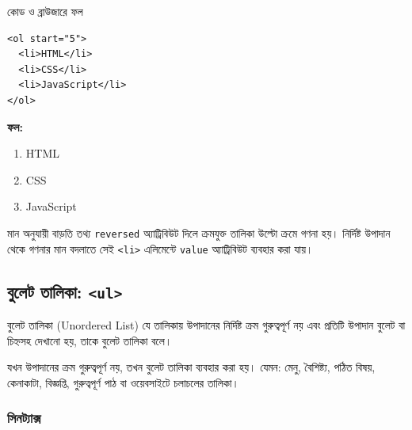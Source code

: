 \begin{chFourWholeExample}{কোড ও ব্রাউজারে ফল}
\noindent
\begin{minipage}[t]{.50\linewidth}\vspace{0pt}

\begin{verbatim}
<ol start="5">
  <li>HTML</li>
  <li>CSS</li>
  <li>JavaScript</li>
</ol>
\end{verbatim}

\end{minipage}\hfill
\begin{minipage}[t]{.46\linewidth}\vspace{0pt}
\textbf{ফল:}
\begin{enumerate}[start=5]
\item HTML
\item CSS
\item JavaScript
\end{enumerate}
\end{minipage}
\end{chFourWholeExample}

\begin{keypointbox}{মান অনুযায়ী বাড়তি তথ্য}
\texttt{reversed} অ্যাট্রিবিউট দিলে ক্রমযুক্ত তালিকা উল্টো ক্রমে গণনা হয়।
নির্দিষ্ট উপাদান থেকে গণনার মান বদলাতে সেই \texttt{<li>} এলিমেন্টে \texttt{value} অ্যাট্রিবিউট ব্যবহার করা যায়।
\end{keypointbox}



\subsection{বুলেট তালিকা: \texttt{<ul>}}

\begin{definitionbox}{বুলেট তালিকা (Unordered List)}
যে তালিকায় উপাদানের নির্দিষ্ট ক্রম গুরুত্বপূর্ণ নয় এবং প্রতিটি উপাদান বুলেট বা চিহ্নসহ দেখানো হয়, তাকে বুলেট তালিকা বলে।
\end{definitionbox}

যখন উপাদানের ক্রম গুরুত্বপূর্ণ নয়, তখন বুলেট তালিকা ব্যবহার করা হয়। যেমন: মেনু, বৈশিষ্ট্য, পঠিত বিষয়, কেনাকাটা, বিজ্ঞপ্তি, গুরুত্বপূর্ণ পাঠ বা ওয়েবসাইটে চলাচলের তালিকা।

\subsubsection{সিনট্যাক্স}

